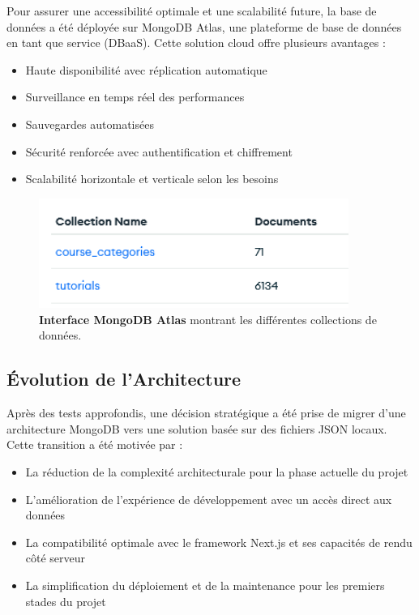 Pour assurer une accessibilité optimale et une scalabilité future, la base de données a été déployée sur MongoDB Atlas, une plateforme de base de données en tant que service (DBaaS). Cette solution cloud offre plusieurs avantages :

\begin{itemize}
  \item Haute disponibilité avec réplication automatique
  \item Surveillance en temps réel des performances
  \item Sauvegardes automatisées
  \item Sécurité renforcée avec authentification et chiffrement
  \item Scalabilité horizontale et verticale selon les besoins
\end{itemize}

\begin{figure}[h!]
  \centering
  \includegraphics[width=0.9\textwidth,keepaspectratio]{week_3_img/Screenshot 2025-05-19 234047.png}
  \caption{\textbf{Interface MongoDB Atlas} montrant les différentes collections de données.}
  \label{fig:mongodb_collections}
\end{figure}

\subsection{Évolution de l'Architecture}

Après des tests approfondis, une décision stratégique a été prise de migrer d'une architecture MongoDB vers une solution basée sur des fichiers JSON locaux. Cette transition a été motivée par :

\begin{itemize}
  \item La réduction de la complexité architecturale pour la phase actuelle du projet
  \item L'amélioration de l'expérience de développement avec un accès direct aux données
  \item La compatibilité optimale avec le framework Next.js et ses capacités de rendu côté serveur
  \item La simplification du déploiement et de la maintenance pour les premiers stades du projet
\end{itemize}

